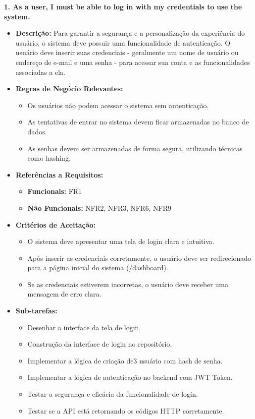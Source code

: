 \textbf{1. As a user, I must be able to log in with my credentials to use the system.}
\begin{itemize}
    \item \textbf{Descrição:} Para garantir a segurança e a personalização da experiência do usuário, o sistema deve possuir uma funcionalidade de autenticação. O usuário deve inserir suas credenciais - geralmente um nome de usuário ou endereço de e-mail e uma senha - para acessar sua conta e as funcionalidades associadas a ela.
    \item \textbf{Regras de Negócio Relevantes:} 
        \begin{itemize}
            \item Os usuários não podem acessar o sistema sem autenticação.
            \item As tentativas de entrar no sistema devem ficar armazenadas no banco de dados.
            \item As senhas devem ser armazenadas de forma segura, utilizando técnicas como hashing.
        \end{itemize}

    \item \textbf{Referências a Requisitos:}
        \begin{itemize}
            \item \textbf{Funcionais:} FR1
            \item \textbf{Não Funcionais:} NFR2, NFR3, NFR6, NFR9 
        \end{itemize}

    \item \textbf{Critérios de Aceitação:}
        \begin{itemize}
            \item O sistema deve apresentar uma tela de login clara e intuitiva.
            \item Após inserir as credenciais corretamente, o usuário deve ser redirecionado para a página inicial do sistema (/dashboard).
            \item Se as credenciais estiverem incorretas, o usuário deve receber uma mensagem de erro clara.
        \end{itemize}

        \item \textbf{Sub-tarefas:}
            \begin{itemize}
                \item Desenhar a interface da tela de login.
                \item Construção da interface de login no repositório.
                \item Implementar a lógica de criação de3 usuário com hash de senha.
                \item Implementar a lógica de autenticação no backend com JWT Token.
                \item Testar a segurança e eficácia da funcionalidade de login.
                \item Testar se a API está retornando os códigos HTTP corretamente.
            \end{itemize}

\end{itemize}



